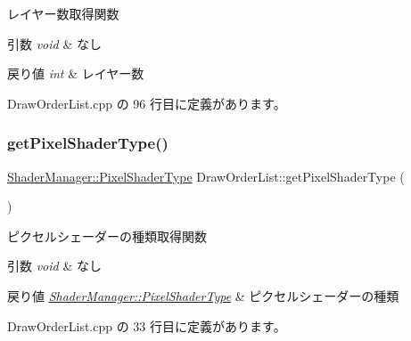 レイヤー数取得関数 


\begin{DoxyParams}{引数}
{\em void} & なし \\
\hline
\end{DoxyParams}

\begin{DoxyRetVals}{戻り値}
{\em int} & レイヤー数 \\
\hline
\end{DoxyRetVals}


 Draw\+Order\+List.\+cpp の 96 行目に定義があります。

\mbox{\label{class_draw_order_list_afc56377beda4eabbf20c5115c3a26ef7}} 
\subsubsection{\texorpdfstring{get\+Pixel\+Shader\+Type()}{getPixelShaderType()}}
{\footnotesize\ttfamily \mbox{\hyperlink{class_shader_manager_a7d15d773b3c6a99dd7086c45c8b0be5f}{Shader\+Manager\+::\+Pixel\+Shader\+Type}} Draw\+Order\+List\+::get\+Pixel\+Shader\+Type (\begin{DoxyParamCaption}{ }\end{DoxyParamCaption})}



ピクセルシェーダーの種類取得関数 


\begin{DoxyParams}{引数}
{\em void} & なし \\
\hline
\end{DoxyParams}

\begin{DoxyRetVals}{戻り値}
{\em \mbox{\hyperlink{class_shader_manager_a7d15d773b3c6a99dd7086c45c8b0be5f}{Shader\+Manager\+::\+Pixel\+Shader\+Type}}} & ピクセルシェーダーの種類 \\
\hline
\end{DoxyRetVals}


 Draw\+Order\+List.\+cpp の 33 行目に定義があります。

\mbox{\label{class_draw_order_list_a2bc0267f11550e6c231682e0824b25b5}} 
